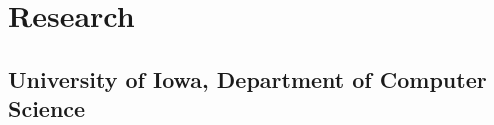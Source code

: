 \documentclass[10pt,letterpaper]{article}
\renewenvironment{itemize}{
  \begin{list}{}{
      \setlength{\leftmargin}{1.5em}
      \setlength{\itemsep}{0.25em}
      \setlength{\parskip}{0pt}
      \setlength{\parsep}{0.25em}
    }
  }{
  \end{list}
}
\newcommand{\yearrange}[1]{\hfill \textbf{#1} \par}
\begin{document}




\section*{Research}

\subsection*{University of Iowa, Department of Computer Science}
\end{document}
